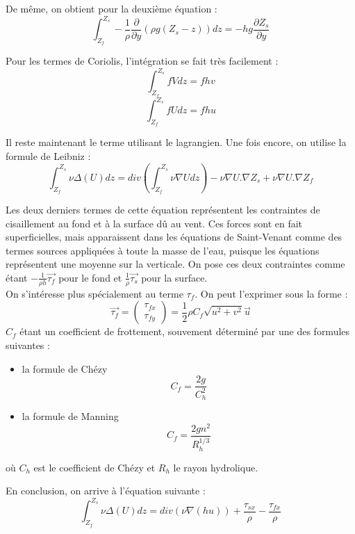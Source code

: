 De même, on obtient pour la deuxième équation :
\begin{equation} \label{II-2-6} \int_{Z_f}^{Z_s} -\frac{1}{\rho} \frac{\partial}{\partial y} (\rho g(Z_s-z)) dz= -hg\frac{\partial Z_s}{\partial y} \end{equation}

Pour les termes de Coriolis, l'intégration se fait très facilement :
\begin{equation} \label{II-2-7} \int_{Z_f}^{Z_s} fV dz = fhv \end{equation}
\begin{equation} \label{II-2-8} \int_{Z_f}^{Z_s} fU dz = fhu \end{equation}

\bigskip
Il reste maintenant le terme utilisant le lagrangien. Une fois encore, on utilise la formule de Leibniz :
\[\int_{Z_f}^{Z_s} \nu \Delta(U) dz = div\left( \int_{Z_f}^{Z_s} \nu \nabla U dz \right) - \nu \nabla U . \nabla Z_s + \nu \nabla U . \nabla Z_f\]

Les deux derniers termes de cette équation représentent les contraintes de cisaillement au fond et à la surface dû au vent. Ces forces sont en fait superficielles, mais apparaissent dans les équations de Saint-Venant comme des termes sources appliquées à toute la masse de l'eau, puisque les équations représentent une moyenne sur la verticale. On pose ces deux contraintes comme étant $-\frac{1}{\rho h}\overrightarrow{\tau_f}$ pour le fond et $\frac{1}{\rho}\overrightarrow{\tau_s}$ pour la surface. \\
On s'intéresse plus spécialement au terme $\tau_f$. On peut l'exprimer sous la forme :
	\[\overrightarrow{\tau_f}=\begin{pmatrix} \tau_{fx} \\ \tau_{fy} \end{pmatrix} = \frac{1}{2} \rho C_f \sqrt{u^2+v^2} \overrightarrow{u}\]
$C_f$ étant un coefficient de frottement, souvement déterminé par une des formules suivantes :
\begin{itemize}
	\item la formule de Chézy \[C_f = \frac{2g}{C_h^2}\]
	\item la formule de Manning \[C_f = \frac{2gn^2}{R_h^{1/3}}\]
\end{itemize}

où $C_h$ est le coefficient de Chézy et $R_h$ le rayon hydrolique. 

\bigskip
En conclusion, on arrive à l'équation suivante :
\begin{equation} \label{II-2-9}
	\int_{Z_f}^{Z_s} \nu \Delta(U) dz = div(\nu \nabla(hu)) + \frac{\tau_{sx}}{\rho} - \frac{\tau_{fx}}{\rho}
\end{equation}

